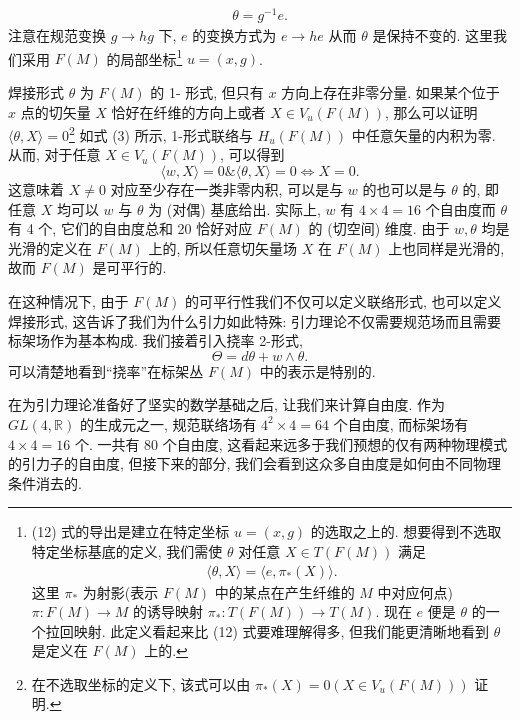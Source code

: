 \documentclass{article}
\begin{document}
\begin{align}
\theta=g^{-1}e.
\end{align}
注意在规范变换 $g\rightarrow hg$ 下, $e$ 的变换方式为 $e\rightarrow he$ 从而 $\theta$ 是保持不变的. 这里我们采用 $F(M)$ 的局部坐标\footnote{(12) 式的导出是建立在特定坐标 $u=(x,g)$ 的选取之上的. 想要得到不选取特定坐标基底的定义, 我们需使 $\theta$ 对任意 $X\in T(F(M))$ 满足
\begin{align}
\langle\theta,X\rangle=\langle e,\pi_{*}(X)\rangle.
\end{align}
这里 $\pi_{*}$ 为射影(表示 $F(M)$ 中的某点在产生纤维的 $M$ 中对应何点) $\pi:F(M)\rightarrow M$ 的诱导映射 $\pi_{*}:T(F(M))\rightarrow T(M)$. 现在 $e$ 便是 $\theta$ 的一个拉回映射. 此定义看起来比 (12) 式要难理解得多, 但我们能更清晰地看到 $\theta$ 是定义在 $F(M)$ 上的.} $u=(x,g)$.

焊接形式 $\theta$ 为 $F(M)$ 的 1- 形式, 但只有 $x$ 方向上存在非零分量. 如果某个位于 $x$ 点的切矢量 $X$ 恰好在纤维的方向上或者 $X\in V_{u}(F(M))$, 那么可以证明 $\langle\theta,X\rangle=0$\footnote{在不选取坐标的定义下, 该式可以由 $\pi_{*}(X)=0(X\in V_{u}(F(M)))$ 证明.} 如式 (3) 所示, 1-形式联络与 $H_{u}(F(M))$ 中任意矢量的内积为零. 从而, 对于任意 $X\in V_{u}(F(M))$, 可以得到
\begin{equation}
\langle w, X\rangle=0\&\langle \theta, X\rangle=0\Leftrightarrow X=0.
\end{equation}
这意味着 $X\neq 0$ 对应至少存在一类非零内积, 可以是与 $w$ 的也可以是与 $\theta$ 的, 即任意 $X$ 均可以 $w$ 与 $\theta$ 为 (对偶) 基底给出. 实际上, $w$ 有 $4\times4=16$ 个自由度而 $\theta$ 有 4 个, 它们的自由度总和 20 恰好对应 $F(M)$ 的 (切空间) 维度. 由于 $w,\theta$ 均是光滑的定义在 $F(M)$ 上的, 所以任意切矢量场 $X$ 在 $F(M)$ 上也同样是光滑的, 故而 $F(M)$ 是可平行的.

在这种情况下, 由于 $F(M)$ 的可平行性我们不仅可以定义联络形式, 也可以定义焊接形式, 这告诉了我们为什么引力如此特殊: 引力理论不仅需要规范场而且需要标架场作为基本构成. 我们接着引入挠率 2-形式,
\begin{equation}
\Theta=d\theta+w\wedge \theta.
\end{equation}
可以清楚地看到“挠率”在标架丛 $F(M)$ 中的表示是特别的.

在为引力理论准备好了坚实的数学基础之后, 让我们来计算自由度. 作为 $GL(4,\mathbb{R})$ 的生成元之一, 规范联络场有 $4^{2}\times4=64$ 个自由度, 而标架场有 $4\times4=16$ 个. 一共有 80 个自由度, 这看起来远多于我们预想的仅有两种物理模式的引力子的自由度, 但接下来的部分, 我们会看到这众多自由度是如何由不同物理条件消去的.
\end{document}
